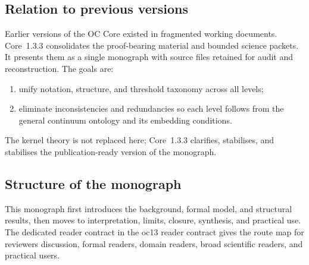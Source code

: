 \subsection{Relation to previous versions}

Earlier versions of the OC Core existed in fragmented working documents.
Core~1.3.3 consolidates the proof-bearing material and bounded science packets.
It presents them as a single monograph with source files retained for audit and
reconstruction. The goals are:

\begin{enumerate}
    \item unify notation, structure, and threshold taxonomy across all levels;
    \item eliminate inconsistencies and redundancies so each level follows from the general continuum ontology and its embedding conditions.
\end{enumerate}

The kernel theory is not replaced here; Core~1.3.3 clarifies, stabilises, and
stabilises the publication-ready version of the monograph.

\subsection{Structure of the monograph}

This monograph first introduces the background, formal model, and structural
results, then moves to interpretation, limits, closure, synthesis, and
practical use. The dedicated reader contract in
the oc13 reader contract gives the route map for reviewers discussion,
formal readers, domain readers, broad scientific readers, and practical
users.
